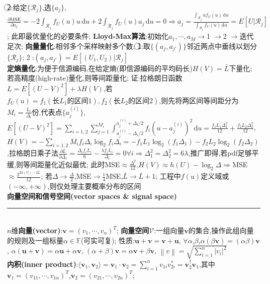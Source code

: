 \documentclass[UTF8,a4paper,10pt]{article}
\providecommand{\abs}[1]{\left\lvert#1\right\rvert}
\providecommand{\norm}[1]{\left\lVert#1\right\rVert}
\begin{document}
\begin{multicols*}{2}
    \textcircled{2}:给定$\{\mathcal{R}_j\}$,选$\{a_j\}$,$\frac{\partial\text{MSE}}{\partial a_j}=-2\int_{\mathcal{R}_j}f_U(u)u\,\mathrm{d}u+2\int_{\mathcal{R}_j}f_U(u)a_j\,\mathrm{d}u=0\Rightarrow a_j=\frac{\int_{\mathcal{R}_j}uf_U(u)\,\mathrm{d}u}{\int_{\mathcal{R}_j}f_U(u)\,\mathrm{d}u}=E[U\vert\mathcal{R}_j]$;%
    此即最优量化的必要条件;%
    \textbf{Lloyd-Max算法}:初始化$a_1,\cdots,a_M\rightarrow$\textcircled{1}$\rightarrow$\textcircled{2}$\rightarrow$迭代足次;%
    \textbf{向量量化}:相邻多个采样映射多个数;%
    \textcircled{1}:取$\{(a_j,a_{j'})\}$邻近两点中垂线以划分$\{\mathcal{R}_j\}$;%
    \textcircled{2}:$(a_j,a_{j'})=E[(U_1,U_2)\vert\mathcal{R}_j]$\\
\textbf{定熵量化}:为便于信源编码,在给定熵(即信源编码的平均码长)$H(V)=\bar{L}$下量化;%
    若高精度(high-rate)量化,则等间距量化;%
    证:拉格朗日函数$L=E[(U-V)^2]+\lambda H(V)$,若$f_U(u)=f_1(\text{长}L_1\text{的区间}1),f_2(\text{长}L_2\text{的区间}2)$,则先将两区间等间距分为$M_i=\frac{L_i}{\Delta_i}$份,代表点$\{a_j^{(i)}\}$,$E[(U-V)^2]=\sum_{i=1,2}\sum_{j=1}^{M_i}\int_{a_j^{(i)}-\Delta_i/2}^{a_j^{(i)}+\Delta_i/2}f_i(u-a_j^{(i)})^2\,\mathrm{d}u=\frac{f_1L_1\Delta_1^2}{12}+\frac{f_2L_2\Delta_2^2}{12}$,$H(V)=-\sum_{i=1,2}M_if_i\Delta_i\log_2 f_i\Delta_i=-f_1L_1\log_2(f_1\Delta_1)-f_2L_2\log_2(f_2\Delta_2)$,拉格朗日乘子法$\frac{\partial L}{\partial\Delta_i}=\frac{\Delta_if_iL_i}{6}-\frac{\lambda f_iL_i}{\Delta_i}=0\forall i\Rightarrow\Delta_1^2=\Delta_2^2=6\lambda$,推广即得,若pdf足够平缓,则等间距量化近似最优;%
    此时MSE$\approx\frac{\Delta^2}{12}$,$H(V)\approx h(U)-\log_2\Delta\Rightarrow$MSE$\approx\frac{2^{2h(U)-2\bar{L}}}{12}$;%
    若$\Delta\rightarrow\frac{\Delta}{2}$,MSE$\rightarrow\frac{1}{4}$MSE,$\bar{L}\rightarrow\bar{L}+1$;%
    工程中$f(u)$定义域或$(-\infty,+\infty)$,则仅处理主要概率分布的区间\\
\textbf{向量空间和信号空间(vector spaces \& signal space)}\rule{\columnwidth-}{.2pt}\\
$n$维\textbf{向量(vector)}:$\bm{v}=(v_1,\cdots,v_n)^T$;%
    \textbf{向量空间}$\mathcal{V}$:一组向量$\bm{v}$的集合,操作此组向量的规则及一组标量$\alpha\in\mathbb{F}$(可实可复);%
    性质:$\bm{u}+\bm{v}=\bm{v}+\bm{u}$,%
    $\forall\alpha$,$\beta$,$\alpha(\beta\bm{v})=(\alpha\beta)\bm{v}$,%
    $\alpha(\bm{u}+\bm{v})=\alpha\bm{u}+\alpha\bm{v}$,%
    $(\alpha+\beta)\bm{v}=\alpha\bm{v}+\beta\bm{v}$,%
    $\norm{v}=\sqrt{\sum_{i=1}^n\abs{v_i}^2}$\\
\textbf{内积(inner product)}:$\langle\bm{v}_1,\bm{v}_2\rangle=\bm{v}_1\cdot\bm{v}_2=\sum_{i=1}^nv_{1i}v_{2i}^*=\bm{v}_2^{\dagger}\bm{v}_1$,其中$\bm{v}_1=(v_{11},\cdots,v_{1n})^T$,$\bm{v}_2=(v_{21},\cdots,v_{2n})^T$;%

\end{multicols*}
\end{document}

